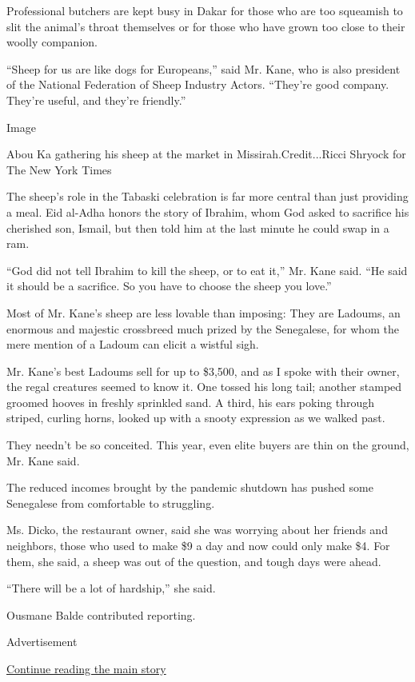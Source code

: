 Professional butchers are kept busy in Dakar for those who are too
squeamish to slit the animal's throat themselves or for those who have
grown too close to their woolly companion.

``Sheep for us are like dogs for Europeans,'' said Mr. Kane, who is also
president of the National Federation of Sheep Industry Actors. ``They're
good company. They're useful, and they're friendly.''

Image

Abou Ka gathering his sheep at the market in Missirah.Credit...Ricci
Shryock for The New York Times

The sheep's role in the Tabaski celebration is far more central than
just providing a meal. Eid al-Adha honors the story of Ibrahim, whom God
asked to sacrifice his cherished son, Ismail, but then told him at the
last minute he could swap in a ram.

``God did not tell Ibrahim to kill the sheep, or to eat it,'' Mr. Kane
said. ``He said it should be a sacrifice. So you have to choose the
sheep you love.''

Most of Mr. Kane's sheep are less lovable than imposing: They are
Ladoums, an enormous and majestic crossbreed much prized by the
Senegalese, for whom the mere mention of a Ladoum can elicit a wistful
sigh.

Mr. Kane's best Ladoums sell for up to \$3,500, and as I spoke with
their owner, the regal creatures seemed to know it. One tossed his long
tail; another stamped groomed hooves in freshly sprinkled sand. A third,
his ears poking through striped, curling horns, looked up with a snooty
expression as we walked past.

They needn't be so conceited. This year, even elite buyers are thin on
the ground, Mr. Kane said.

The reduced incomes brought by the pandemic shutdown has pushed some
Senegalese from comfortable to struggling.

Ms. Dicko, the restaurant owner, said she was worrying about her friends
and neighbors, those who used to make \$9 a day and now could only make
\$4. For them, she said, a sheep was out of the question, and tough days
were ahead.

``There will be a lot of hardship,'' she said.

Ousmane Balde contributed reporting.

Advertisement

\protect\hyperlink{after-bottom}{Continue reading the main story}

